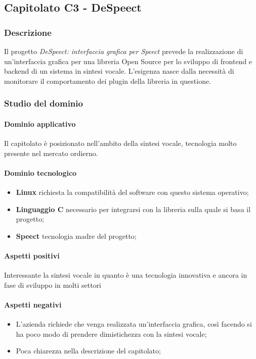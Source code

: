 	
	\subsection{Capitolato C3 - DeSpeect}
	\subsubsection{Descrizione}	
		Il progetto \emph{DeSpeect: interfaccia grafica per Speect} prevede la realizzazione di un'interfaccia grafica per una libreria Open Source per lo sviluppo di frontend e backend di un sistema in sintesi vocale.
		L'esigenza nasce dalla necessità di monitorare il comportamento dei plugin della libreria in questione.
	\subsubsection{Studio del dominio}
	
	\paragraph{Dominio applicativo} \Spazio
     Il capitolato è posizionato nell'ambito della sintesi vocale, tecnologia molto presente nel mercato ordierno. 
	\paragraph{Dominio tecnologico}
	\begin{itemize}
		\item \textbf{Linux} richiesta la compatibilità del software con questo sistema operativo;
		\item  \textbf{Linguaggio C} necessario per integrarsi con la libreria sulla quale si basa il progetto;
		\item  \textbf{Speect} tecnologia madre del progetto;
	\end{itemize}
	\paragraph{Aspetti positivi} \Spazio
		 Interessante la sintesi vocale in quanto è una tecnologia innovativa e ancora in fase di sviluppo in molti settori
	\paragraph{Aspetti negativi} \Spazio 
	\begin{itemize}
		\item L'azienda richiede che venga realizzata un'interfaccia grafica, così facendo si ha poco modo di prendere dimistichezza con la sintesi vocale;
		\item Poca chiarezza nella descrizione del capitolato;
	\end{itemize}
